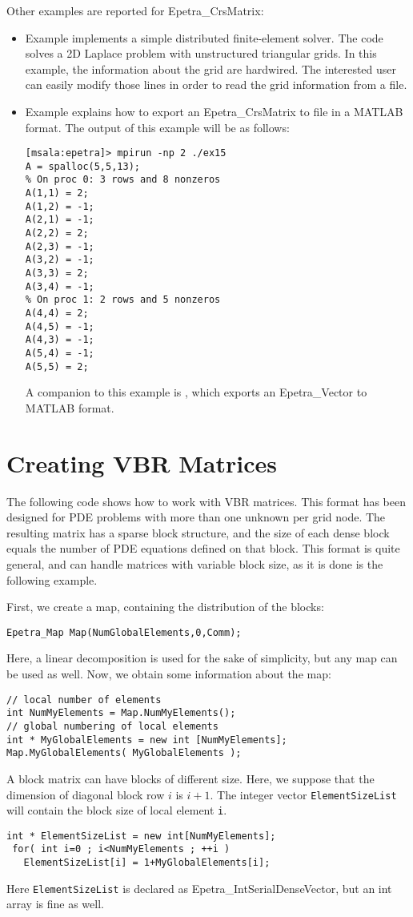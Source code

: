Other examples are reported for Epetra\_CrsMatrix:
\begin{itemize}
\item Example  implements a simple distributed
  finite-element solver.  The code solves a 2D Laplace problem with
  unstructured triangular grids. In this example, the information about
  the grid are hardwired.  The interested user can easily modify those
  lines in order to read the grid information from a file.
\item Example  explains how to export an
  Epetra\_CrsMatrix to file in a MATLAB format.  The output of this
  example will be as follows:
\begin{verbatim}
[msala:epetra]> mpirun -np 2 ./ex15
A = spalloc(5,5,13);
% On proc 0: 3 rows and 8 nonzeros
A(1,1) = 2;
A(1,2) = -1;
A(2,1) = -1;
A(2,2) = 2;
A(2,3) = -1;
A(3,2) = -1;
A(3,3) = 2;
A(3,4) = -1;
% On proc 1: 2 rows and 5 nonzeros
A(4,4) = 2;
A(4,5) = -1;
A(4,3) = -1;
A(5,4) = -1;
A(5,5) = 2;
\end{verbatim}
  A companion to this
  example is , which exports an Epetra\_Vector to
  MATLAB format.
\end{itemize}

\section{Creating VBR Matrices}
\label{sec:sparse_vbr}

The following code shows how to work with VBR matrices. This format has
been designed for PDE problems with more than one unknown per grid node.
The resulting matrix has a sparse block structure, and the size of each
dense block equals the number of PDE equations defined on that block.
This format is quite general, and can handle matrices with variable
block size, as it is done is the following example.

First, we create a map, containing the distribution of the blocks:
\begin{verbatim}
Epetra_Map Map(NumGlobalElements,0,Comm);
\end{verbatim}
Here, a linear decomposition is used for the sake of simplicity, but any
map can be used as well.
Now, we obtain some information about the map:
\begin{verbatim}
// local number of elements
int NumMyElements = Map.NumMyElements();
// global numbering of local elements
int * MyGlobalElements = new int [NumMyElements];
Map.MyGlobalElements( MyGlobalElements );
\end{verbatim}
A block matrix can have blocks of different size.  Here, we suppose that
the dimension of diagonal block row $i$ is $i+1$.  The integer vector
\verb!ElementSizeList! will contain the block size of local element
\verb!i!.
\begin{verbatim}
int * ElementSizeList = new int[NumMyElements];
 for( int i=0 ; i<NumMyElements ; ++i ) 
   ElementSizeList[i] = 1+MyGlobalElements[i];
\end{verbatim}
Here \verb!ElementSizeList! is declared as Epetra\_IntSerialDenseVector,
but an int array is fine as well.

